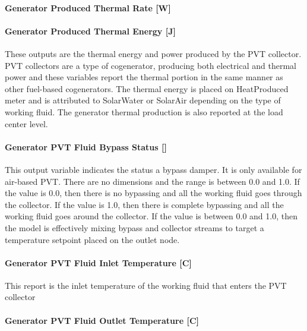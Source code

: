 \paragraph{Generator Produced Thermal Rate {[}W{]}}\label{generator-produced-thermal-rate-w-000}

\paragraph{Generator Produced Thermal Energy {[}J{]}}\label{generator-produced-thermal-energy-j-000}

These outputs are the thermal energy and power produced by the PVT collector. PVT collectors are a type of cogenerator, producing both electrical and thermal power and these variables report the thermal portion in the same manner as other fuel-based cogenerators. The thermal energy is placed on HeatProduced meter and is attributed to SolarWater or SolarAir depending on the type of working fluid. The generator thermal production is also reported at the load center level.

\paragraph{Generator PVT Fluid Bypass Status {[]}}\label{generator-pvt-fluid-bypass-status}

This output variable indicates the status a bypass damper. It is only available for air-based PVT. There are no dimensions and the range is between 0.0 and 1.0. If the value is 0.0, then there is no bypassing and all the working fluid goes through the collector. If the value is 1.0, then there is complete bypassing and all the working fluid goes around the collector. If the value is between 0.0 and 1.0, then the model is effectively mixing bypass and collector streams to target a temperature setpoint placed on the outlet node.

\paragraph{Generator PVT Fluid Inlet Temperature {[}C{]}}\label{generator-pvt-fluid-inlet-temperature-c}

This report is the inlet temperature of the working fluid that enters the PVT collector

\paragraph{Generator PVT Fluid Outlet Temperature {[}C{]}}\label{generator-pvt-fluid-outlet-temperature-c}

